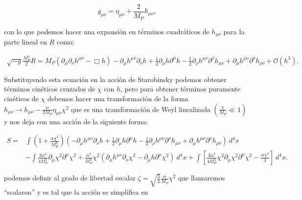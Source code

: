 \begin{equation}
    g_{\mu \nu} = \eta_{\mu \nu} + \frac{2}{M_P} h_{\mu \nu},
\end{equation}

\noindent
con lo que podemos hacer una expansión en términos cuadráticos de $h_{\mu \nu}$ para la parte lineal en $R$ como:

\begin{equation}
    \begin{split}
        \sqrt{-g} \frac{M_P^2}{2} R = M_P \left( \partial_\mu \partial_\nu h^{\mu \nu} - \Box h \right) - \partial_\mu h^{\mu \nu} \partial_\nu h + \frac{1}{2} \partial_\mu h \partial^\mu h - \frac{1}{2} \partial_\rho h^{\mu \nu} \partial^\rho h_{\mu \nu} + \partial_\mu h^{\mu \nu} \partial^\rho h_{\rho \nu} + \mathcal{O} \left( h^3 \right).
    \end{split}
\end{equation}

\noindent
Substituyendo esta ecuación en la acción de Starobinsky podemos obtener términos cinéticos cruzados de $\chi$ con $h$, pero para obtener términos puramente cinéticos de $\chi$ debemos hacer una transformación de la forma $\displaystyle h_{\mu \nu} \to h_{\mu \nu} - \frac{\alpha}{2 M_P} \eta_{\mu \nu} \chi^2$ que es una transformación de Weyl linealizada $\left( \frac{\chi}{M_P} \ll 1 \right)$ y nos deja con una acción de la siguiente forma:

\begin{equation}
    \begin{split}
        S =& \int \left( 1 + \frac{\alpha \chi^2}{M_P^2} \right) \left( - \partial_\mu h^{\mu \nu} \partial_\nu h + \frac{1}{2} \partial_\mu h \partial^\mu h - \frac{1}{2} \partial_\rho h^{\mu \nu} \partial^\rho h_{\mu \nu} + \partial_\mu h^{\mu \nu} \partial^\rho h_{\rho \nu} \right) ~ d^4 x\\
        &- \int \frac{3 \alpha^2}{4 M_P^2} \partial_\mu \chi^2 \partial^\mu \chi^2 + \frac{\alpha^2}{M_P^3} \chi^2 \left( \partial_\mu h^{\mu \nu} \partial_\nu \chi^2 - \partial_\mu h \partial^\mu \chi^2 \right) ~ d^4 x + \int \left[ \frac{3 \alpha^3}{4 M_P^4} \chi^2 \partial_\mu \chi^2 \partial^\mu \chi^2 - \frac{\alpha \chi^4}{4} \right] ~ d^4 x.
    \end{split}
\end{equation}

\noindent
podemos definir al grado de libertad escalar $\displaystyle \zeta = \sqrt{\frac{3}{2}} \frac{\alpha}{M_P} \chi^2$ que llamaremos ``scalaron'' y es tal que la acción se simplifica en 

